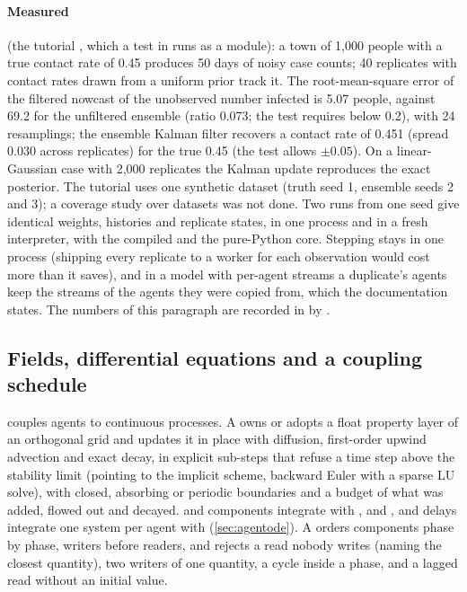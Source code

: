 \paragraph{Measured} (the tutorial , which a test in
 runs as a module): a town of 1,000 people with a true
contact rate of 0.45 produces 50 days of noisy case counts; 40 replicates with contact rates
drawn from a uniform prior track it. The root-mean-square error of the filtered nowcast of the
unobserved number infected is 5.07 people, against 69.2 for the unfiltered ensemble (ratio
0.073; the test requires below 0.2), with 24 resamplings; the ensemble Kalman filter
recovers a contact rate of 0.451 (spread 0.030 across replicates) for the true 0.45 (the test
allows $\pm 0.05$). On a linear-Gaussian case with 2,000 replicates the Kalman update
reproduces the exact posterior. The tutorial uses one synthetic dataset (truth seed 1,
ensemble seeds 2 and 3); a coverage study over datasets was not done. Two runs from one seed
give identical weights, histories and
replicate states, in one process and in a fresh interpreter, with the compiled and the
pure-Python core. Stepping stays in one process (shipping every replicate to a worker for each
observation would cost more than it saves), and in a model with per-agent streams a
duplicate's agents keep the streams of the agents they were copied from, which the
documentation states. The numbers of this paragraph are recorded in
 by .

\subsection{Fields, differential equations and a coupling schedule}
\label{app:couple}

 couples agents to continuous processes. A  owns or adopts a
float property layer of an orthogonal grid and updates it in place with diffusion, first-order
upwind advection and exact decay, in explicit sub-steps that refuse a time step above the
stability limit (pointing to the implicit scheme, backward Euler with a sparse LU solve), with
closed, absorbing or periodic boundaries and a budget of what was added, flowed out and
decayed.  and  components integrate with , and
,  and delays integrate one system per agent with
 (\cref{sec:agentode}). A
 orders components phase by phase, writers before readers, and 
rejects a read nobody writes (naming the closest quantity), two writers of one quantity, a
cycle inside a phase, and a lagged read without an initial value.

